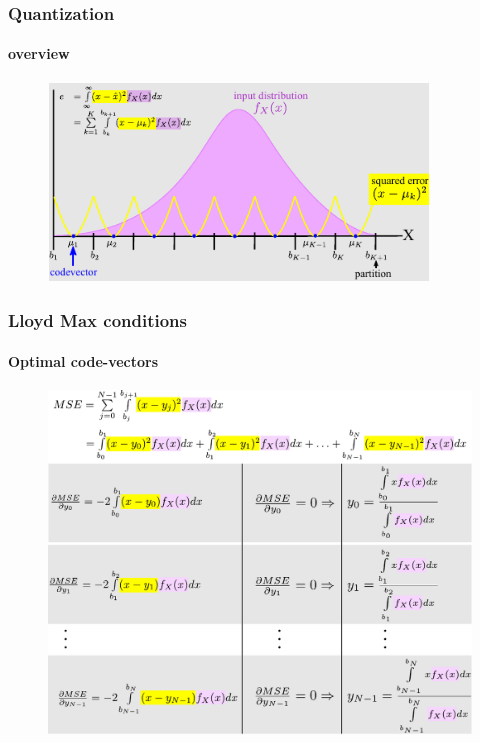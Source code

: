 \begin{frame}
\frametitle{Quantization}
\framesubtitle{overview}
\logoCSIPCPL\mypagenum
	\begin{figure}				
		\includegraphics[width=0.9\textwidth]{thesis/Quantization_MSE.pdf}
	\end{figure}
\end{frame}





\begin{frame}[plain]
\frametitle{Lloyd Max conditions}
\framesubtitle{Optimal code-vectors}
\logoCSIPCPL\mypagenum
	\begin{changemargin}{-1.3in}{0in}
		\begin{figure}				
			\includegraphics[height=0.8\textheight]{thesis/Quantization_optimalCodevectors.pdf}
		\end{figure}
	\end{changemargin}
\end{frame}



